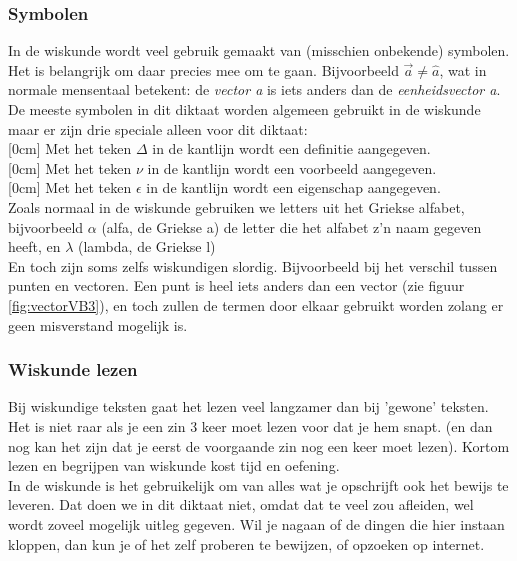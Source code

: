     


\subsubsection{Symbolen}
In de wiskunde wordt veel gebruik gemaakt van (misschien onbekende) symbolen. Het is belangrijk om daar precies mee om te gaan. Bijvoorbeeld $ \vec{a} \ne \hat{a} $, wat in normale mensentaal betekent: de \textit{vector a} is iets anders dan de \textit{eenheidsvector a}. De meeste symbolen in dit diktaat worden algemeen gebruikt in de wiskunde maar er zijn drie speciale alleen voor dit diktaat:\\
[0cm]
Met het teken {\Large $ \Delta $ }in de kantlijn wordt een definitie aangegeven.\\
[0cm]
Met het teken {\LARGE $ \nu $ }  in de kantlijn wordt een voorbeeld aangegeven.\\
[0cm]
Met het teken {\LARGE $ \epsilon $ }  in de kantlijn wordt  een eigenschap aangegeven.\\

Zoals normaal in de wiskunde gebruiken we letters uit het Griekse alfabet, bijvoorbeeld $ \alpha $ (alfa, de Griekse a) de letter die het alfabet z'n naam gegeven heeft, en  $ \lambda $ (lambda, de Griekse l)\\
En toch zijn soms zelfs wiskundigen slordig. Bijvoorbeeld bij het verschil tussen punten en vectoren. Een punt is heel iets anders dan een vector  (zie figuur \ref{fig:vectorVB3}), en toch zullen de termen door elkaar gebruikt worden zolang er geen misverstand mogelijk is.

\subsubsection{Wiskunde lezen}
Bij wiskundige teksten gaat het lezen veel langzamer  dan bij 'gewone' teksten. Het is niet raar als je een zin 3 keer moet lezen voor dat je hem snapt. (en dan nog kan het zijn dat je eerst de voorgaande zin nog een keer moet lezen). Kortom lezen en begrijpen van wiskunde kost tijd en oefening. \\

In de wiskunde is het gebruikelijk om van alles wat je opschrijft ook het bewijs te leveren. Dat doen we in dit diktaat niet, omdat dat te veel zou afleiden, wel wordt zoveel mogelijk uitleg gegeven. Wil je nagaan of de dingen die hier instaan kloppen, dan kun je of het zelf proberen te bewijzen, of opzoeken op internet.

